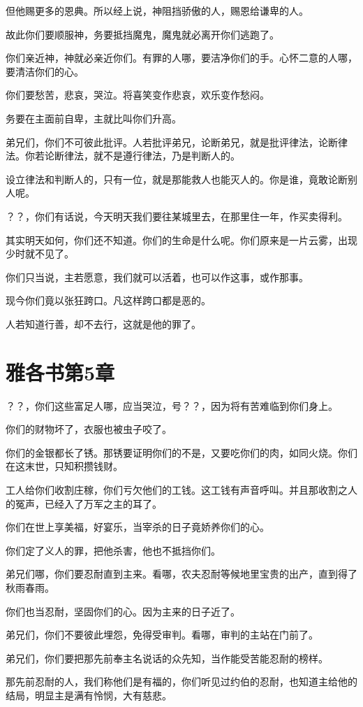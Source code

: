 \documentclass[12pt,oneside]{book}
\begin{document}
但他赐更多的恩典。所以经上说，神阻挡骄傲的人，赐恩给谦卑的人。

故此你们要顺服神，务要抵挡魔鬼，魔鬼就必离开你们逃跑了。

你们亲近神，神就必亲近你们。有罪的人哪，要洁净你们的手。心怀二意的人哪，要清洁你们的心。

你们要愁苦，悲哀，哭泣。将喜笑变作悲哀，欢乐变作愁闷。

务要在主面前自卑，主就比叫你们升高。

弟兄们，你们不可彼此批评。人若批评弟兄，论断弟兄，就是批评律法，论断律法。你若论断律法，就不是遵行律法，乃是判断人的。

设立律法和判断人的，只有一位，就是那能救人也能灭人的。你是谁，竟敢论断别人呢。

？？，你们有话说，今天明天我们要往某城里去，在那里住一年，作买卖得利。

其实明天如何，你们还不知道。你们的生命是什么呢。你们原来是一片云雾，出现少时就不见了。

你们只当说，主若愿意，我们就可以活着，也可以作这事，或作那事。

现今你们竟以张狂跨口。凡这样跨口都是恶的。

人若知道行善，却不去行，这就是他的罪了。

\chapter{雅各书第5章}
？？，你们这些富足人哪，应当哭泣，号？？，因为将有苦难临到你们身上。

你们的财物坏了，衣服也被虫子咬了。

你们的金银都长了锈。那锈要证明你们的不是，又要吃你们的肉，如同火烧。你们在这末世，只知积攒钱财。

工人给你们收割庄稼，你们亏欠他们的工钱。这工钱有声音呼叫。并且那收割之人的冤声，已经入了万军之主的耳了。

你们在世上享美福，好宴乐，当宰杀的日子竟娇养你们的心。

你们定了义人的罪，把他杀害，他也不抵挡你们。

弟兄们哪，你们要忍耐直到主来。看哪，农夫忍耐等候地里宝贵的出产，直到得了秋雨春雨。

你们也当忍耐，坚固你们的心。因为主来的日子近了。

弟兄们，你们不要彼此埋怨，免得受审判。看哪，审判的主站在门前了。

弟兄们，你们要把那先前奉主名说话的众先知，当作能受苦能忍耐的榜样。

那先前忍耐的人，我们称他们是有福的，你们听见过约伯的忍耐，也知道主给他的结局，明显主是满有怜悯，大有慈悲。
\end{document}
